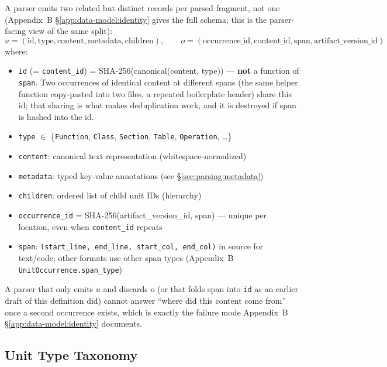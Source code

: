 \begin{definition}
\label{def:semantic-unit}
A parser emits two related but distinct records per parsed fragment, not one (Appendix~B \S\ref{app:data-model:identity} gives the full schema; this is the parser-facing view of the same split):
\begin{equation}
u = (\text{id}, \text{type}, \text{content}, \text{metadata}, \text{children}), \qquad
o = (\text{occurrence\_id}, \text{content\_id}, \text{span}, \text{artifact\_version\_id})
\end{equation}
where:
\begin{itemize}
  \item \texttt{id} (= \texttt{content\_id}) = SHA-256(canonical(content, type)) --- \textbf{not} a function of \texttt{span}. Two occurrences of identical content at different spans (the same helper function copy-pasted into two files, a repeated boilerplate header) share this id; that sharing is what makes deduplication work, and it is destroyed if span is hashed into the id.
  \item \texttt{type} $\in$ \{\texttt{Function}, \texttt{Class}, \texttt{Section}, \texttt{Table}, \texttt{Operation}, \dots\}
  \item \texttt{content}: canonical text representation (whitespace-normalized)
  \item \texttt{metadata}: typed key-value annotations (see \S\ref{sec:parsing:metadata})
  \item \texttt{children}: ordered list of child unit IDs (hierarchy)
  \item \texttt{occurrence\_id} = SHA-256(artifact\_version\_id, span) --- unique per location, even when \texttt{content\_id} repeats
  \item \texttt{span}: \texttt{(start\_line, end\_line, start\_col, end\_col)} in source for text/code; other formats use other span types (Appendix~B \texttt{UnitOccurrence.span\_type})
\end{itemize}
A parser that only emits $u$ and discards $o$ (or that folds span into \texttt{id} as an earlier draft of this definition did) cannot answer ``where did this content come from'' once a second occurrence exists, which is exactly the failure mode Appendix~B \S\ref{app:data-model:identity} documents.
\end{definition}

\subsection{Unit Type Taxonomy}
\label{sec:parsing:unit-types}

